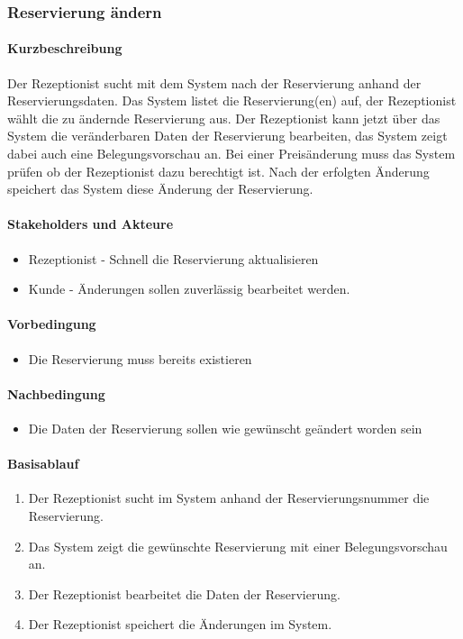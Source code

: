 \subsubsection{Reservierung ändern}
\label{UseCase_ReservierungÄndern}

\paragraph{Kurzbeschreibung}
Der \Gls{Rezeptionist} sucht mit dem System nach der \Gls{Reservierung} anhand der Reservierungsdaten. Das System listet die \Gls{Reservierung}(en) auf,  der \Gls{Rezeptionist} wählt die zu ändernde \Gls{Reservierung} aus. Der \Gls{Rezeptionist} kann jetzt über das System die veränderbaren Daten der \Gls{Reservierung} bearbeiten, das System zeigt dabei auch eine \Gls{Belegungsvorschau} an. Bei einer Preisänderung muss das System prüfen ob der \Gls{Rezeptionist} dazu berechtigt ist. Nach der erfolgten Änderung speichert das System diese Änderung der \Gls{Reservierung}.

\paragraph{Stakeholders und Akteure}
\begin{itemize}
	\item \Gls{Rezeptionist} - Schnell die \Gls{Reservierung} aktualisieren
	\item \Gls{Kunde} - Änderungen sollen zuverlässig bearbeitet werden.
\end{itemize}

\paragraph{Vorbedingung}
\begin{itemize}
	\item Die \Gls{Reservierung} muss bereits existieren
\end{itemize}

\paragraph{Nachbedingung}
\begin{itemize}
	\item Die Daten der \Gls{Reservierung} sollen wie gewünscht geändert worden sein
\end{itemize}

\paragraph{Basisablauf}
\begin{enumerate}
	\item Der \Gls{Rezeptionist} sucht im System anhand der \Gls{Reservierungsnummer} die \Gls{Reservierung}.
	\item Das System zeigt die gewünschte \Gls{Reservierung} mit einer \Gls{Belegungsvorschau} an.
	\item Der \Gls{Rezeptionist} bearbeitet die Daten der \Gls{Reservierung}.
	\item Der \Gls{Rezeptionist} speichert die Änderungen im System.
\end{enumerate}

